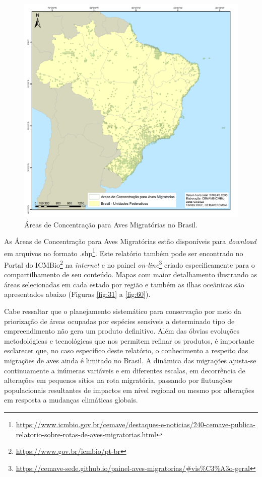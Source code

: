 \documentclass[
  oneside]{scrbook}
\DeclareRobustCommand{\href}[2]{#2\footnote{\url{#1}}}
\begin{document}
\begin{figure}[H]

{\centering \includegraphics[width=0.75\linewidth]{imagens/cap07/Figura_7.10} 

}

\caption{Áreas de Concentração para Aves Migratórias no Brasil.}\label{fig:30}
\end{figure}

As Áreas de Concentração para Aves Migratórias estão disponíveis para \emph{download} em \href{https://www.icmbio.gov.br/cemave/destaques-e-noticias/240-cemave-publica-relatorio-sobre-rotas-de-aves-migratorias.html}{arquivos no formato .shp}. Este relatório também pode ser encontrado no \href{https://www.gov.br/icmbio/pt-br}{Portal do ICMBio} na \emph{internet} e no \href{https://cemave-sede.github.io/painel-aves-migratorias/\#vis\%C3\%A3o-geral}{painel \emph{on-line}} criado especificamente para o compartilhamento de seu conteúdo. Mapas com maior detalhamento ilustrando as áreas selecionadas em cada estado por região e também as ilhas oceânicas são apresentados abaixo (Figuras \ref{fig:31} a \ref{fig:60}).

Cabe ressaltar que o planejamento sistemático para conservação por meio da priorização de áreas ocupadas por espécies sensíveis a determinado tipo de empreendimento não gera um produto definitivo. Além das óbvias evoluções metodológicas e tecnológicas que nos permitem refinar os produtos, é importante esclarecer que, no caso específico deste relatório, o conhecimento a respeito das migrações de aves ainda é limitado no Brasil. A dinâmica das migrações ajusta-se continuamente a inúmeras variáveis e em diferentes escalas, em decorrência de alterações em pequenos sítios na rota migratória, passando por flutuações populacionais resultantes de impactos em nível regional ou mesmo por alterações em resposta a mudanças climáticas globais.
\end{document}
